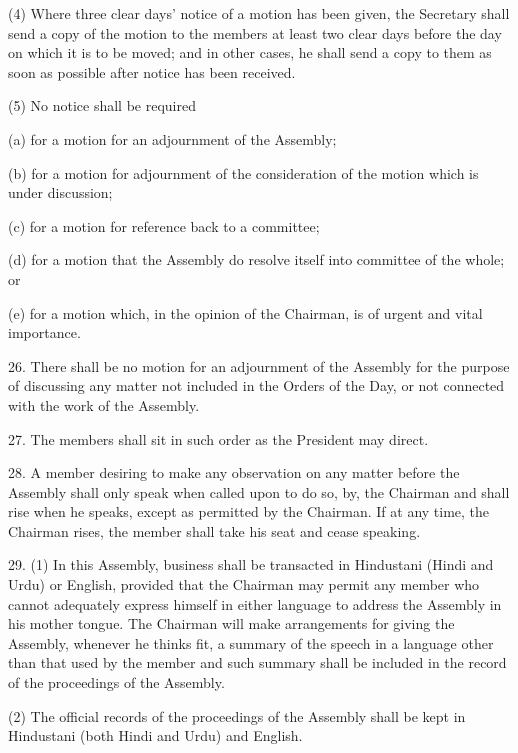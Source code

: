 (4) Where three clear days\textquoteright{} notice of a motion has been given, the Secretary shall send a copy of the motion to the members at least two clear days before the day on which it is to be moved; and in other cases, he shall send a copy to them as soon as possible after notice has been received.



(5) No notice shall be required\textemdash{}



(a) for a motion for an adjournment of the Assembly;

(b) for a motion for adjournment of the consideration of the motion which is under discussion;

(c) for a motion for reference back to a committee;

(d) for a motion that the Assembly do resolve itself into committee of the whole; or

(e) for a motion which, in the opinion of the Chairman, is of urgent and vital importance.



26. There shall be no motion for an adjournment of the Assembly for the purpose of discussing any matter not included in the Orders of the Day, or not connected with the work of the Assembly.



27. The members shall sit in such order as the President may direct.



28. A member desiring to make any observation on any matter before the Assembly shall only speak when called upon to do so, by, the Chairman and shall rise when he speaks, except as permitted by the Chairman. If at any time, the Chairman rises, the member shall take his seat and cease speaking.



29. (1) In this Assembly, business shall be transacted in Hindustani (Hindi and Urdu) or English, provided that the Chairman may permit any member who cannot adequately express himself in either language to address the Assembly in his mother tongue. The Chairman will make arrangements for giving the Assembly, whenever he thinks fit, a summary of the speech in a language other than that used by the member and such summary shall be included in the record of the proceedings of the Assembly.



(2) The official records of the proceedings of the Assembly shall be kept in Hindustani (both Hindi and Urdu) and English.



